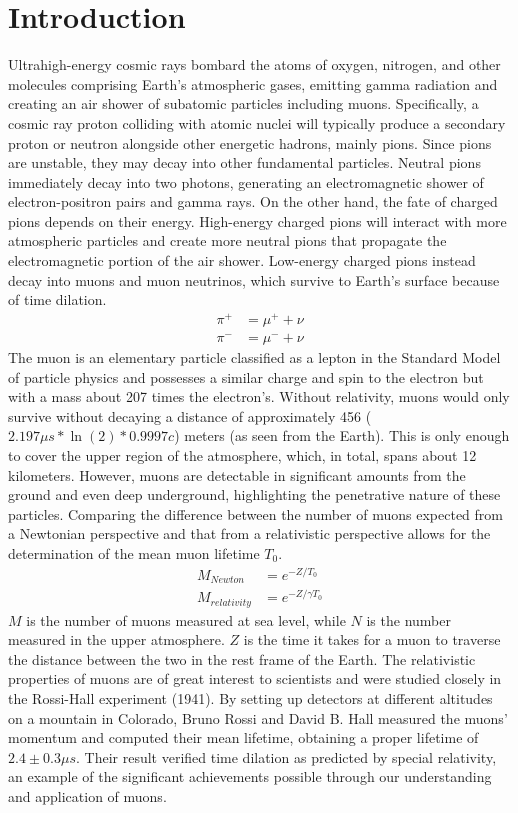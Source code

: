 \documentclass[
 reprint,
 twocolumn,
 amsmath,amssymb,
 aps,
 pra,
 floatfix,
]{revtex4-1}
\begin{document}
\section{Introduction}
Ultrahigh-energy cosmic rays bombard the atoms of oxygen, nitrogen, and other
molecules comprising Earth's atmospheric gases, emitting gamma radiation and
creating an air shower of subatomic particles including muons. Specifically,
a cosmic ray proton colliding with atomic nuclei will typically produce a
secondary proton or neutron alongside other energetic hadrons, mainly pions.
Since pions are unstable, they may decay into other fundamental particles.
Neutral pions immediately decay into two photons, generating an electromagnetic
shower of electron-positron pairs and gamma rays.\cite{gaisser2016} On the other
hand, the fate of charged pions depends on their energy. High-energy charged
pions will interact with more atmospheric particles and create more neutral
pions that propagate the electromagnetic portion of the air shower. Low-energy
charged pions instead decay into muons and muon neutrinos,
which survive to Earth's surface because of time dilation.
\begin{align}
    \pi^+ &= \mu^+ + \nu\\
    \pi^- &= \mu^- + \nu
\end{align}
The muon is an elementary particle classified as a lepton in the Standard Model of particle physics
and possesses a similar charge and spin to the electron but with a mass about 207 times the electron's.\cite{nistconstant}
Without relativity, muons would only survive without decaying a distance of
approximately 456 ($2.197 \mu s * \ln(2) * 0.9997c$) meters (as seen from the Earth). This is only enough to
cover the upper region of the atmosphere, which, in total, spans about 12
kilometers. However, muons are detectable in significant amounts from the
ground and even deep underground, highlighting the penetrative nature of these
particles. Comparing the difference between the number of muons expected from
a Newtonian perspective and that from a relativistic perspective allows for the
determination of the mean muon lifetime $T_0$.
\begin{align}
    M_{Newton} &= e^{-Z/T_0}\\
    M_{relativity} &= e^{-Z/\gamma T_0}
\end{align}
$M$ is the number of muons measured at sea level, while $N$ is the number
measured in the upper atmosphere. $Z$ is the time it takes for a muon to
traverse the distance between the two in the rest frame of the Earth. The
relativistic properties of muons are of great interest to scientists and
were studied closely in the Rossi-Hall experiment (1941). By setting up
detectors at different altitudes on a mountain in Colorado, Bruno Rossi and 
David B. Hall measured the muons' momentum and computed their mean lifetime,
obtaining a proper lifetime of $2.4 \pm 0.3 \mu s$.\cite{PhysRev.59.223} Their
result verified time dilation as predicted by special relativity, an example of
the significant achievements possible through our understanding and application
of muons.
\end{document}
